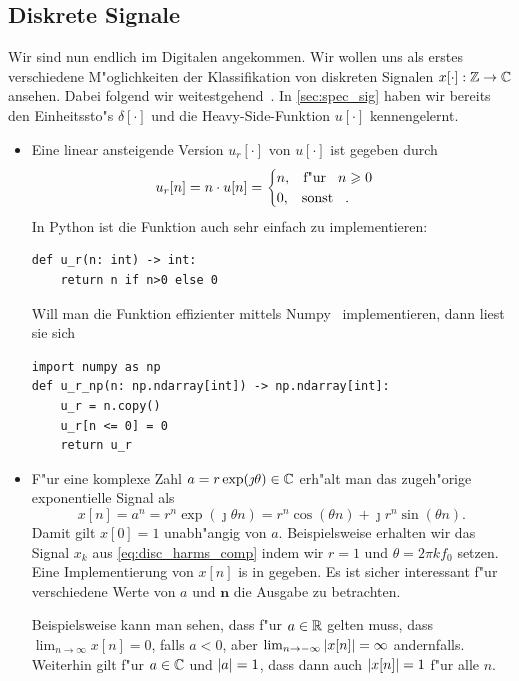 \subsection{Diskrete Signale}

Wir sind nun endlich im Digitalen angekommen. 
Wir wollen uns als erstes verschiedene M"oglichkeiten der Klassifikation von diskreten Signalen $x[\cdot] : \mathbb{Z} \rightarrow \mathbb{C}$ ansehen.
Dabei folgend wir weitestgehend~\cite[Kap.~2.1]{proakis2013}.
In \cref{sec:spec_sig} haben wir bereits den Einheitssto"s $\delta[\cdot]$ und die Heavy-Side-Funktion $u[\cdot]$ kennengelernt.

\begin{itemize}
    \item Eine linear ansteigende Version $u_r[\cdot]$ von $u[\cdot]$ ist gegeben durch
    \[
        u_r[n] = n \cdot u[n] = \begin{cases}
            n, {\hspace{3mm} \text{f"ur} \hspace{3mm}} n \geqslant 0 \\
            0, {\hspace{3mm} \text{sonst} \hspace{3mm}}.
        \end{cases}
    \]
    In Python ist die Funktion auch sehr einfach zu implementieren:
\begin{verbatim}
def u_r(n: int) -> int:
    return n if n>0 else 0
\end{verbatim}
Will man die Funktion effizienter mittels Numpy~\cite{numpy} implementieren, dann liest sie sich
\begin{verbatim}
import numpy as np
def u_r_np(n: np.ndarray[int]) -> np.ndarray[int]:
    u_r = n.copy()
    u_r[n <= 0] = 0
    return u_r
\end{verbatim}
\item F"ur eine komplexe Zahl $a = r \exp(\jmath \theta) \in \mathbb{C}$ erh"alt man das zugeh"orige exponentielle Signal als
\[
    x[n] 
        = a ^ n 
        = r^n \exp(\jmath \theta n) 
        = r^n \cos(\theta n) + \jmath r^n \sin(\theta n).
\]
Damit gilt $x[0] = 1$ unabh"angig von $a$.
Beispielsweise erhalten wir das Signal $x_k$ aus \eqref{eq:disc_harms_comp} indem wir $r=1$ und $\theta = 2 \pi k f_0$ setzen.
Eine Implementierung von $x[n]$ is in  gegeben.
Es ist sicher interessant f"ur verschiedene Werte von $a$ und $\bm n$ die Ausgabe zu betrachten.

Beispielsweise kann man sehen, dass f"ur $a \in \mathbb{R}$ gelten muss, dass $\lim_{n \rightarrow \infty} x[n] = 0$, falls $a < 0$, aber $\lim_{n \rightarrow -\infty} {\left| x[n] \right|} = \infty$ andernfalls.
Weiterhin gilt f"ur $a \in \mathbb{C}$ und ${\left| a \right|} = 1$, dass dann auch ${\left| x[n] \right|} = 1$ f"ur alle $n$.
\end{itemize}
